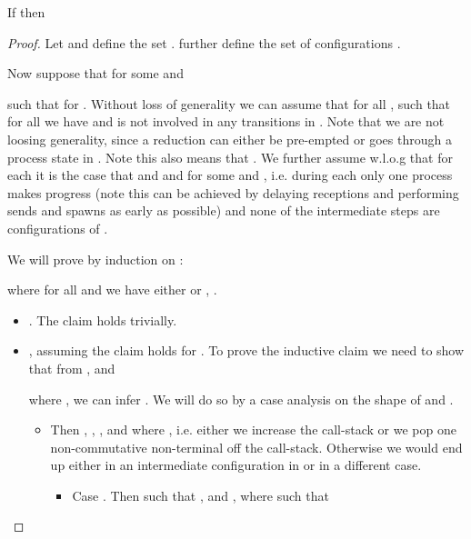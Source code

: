\begin{proposition}\label{apx:prop:conc_reduction_simulation}
If 
then 
\end{proposition}
\begin{proof}
Let  and define the set
.
further define the set of configurations
.

Now suppose that for some  and 
 
such that  for . Without loss of generality we can assume that for all ,  such that for all 
 we have  and 
 is not involved in any transitions in 
. 
Note that we are not loosing generality, since a reduction 
 can either be pre-empted or goes through a process state in . 
Note this also means that . We further assume w.l.o.g that for each  it is the case that 
 and  
and  
for some  and ,
i.e. during each  only one process makes progress (note this can be achieved by delaying receptions and performing sends and spawns as early as possible) and none of the intermediate steps are configurations of .

We will prove by induction on : 

where for all  and  we have either  or , .
\begin{itemize}
	\item . \newline
	The claim holds trivially.
	\item , assuming the claim holds for . \newline
	To prove the inductive claim we need to show that from
	, 
	and
	
	where ,
	we can infer .
	We will do so by a case analysis on the shape of  and .
	\begin{itemize}
		\item  \newline
		Then , , , 
		 and  where , i.e. either we increase the call-stack or we pop one non-commutative non-terminal off the call-stack. Otherwise we would end up either in an intermediate configuration in  or in a different case.
		\begin{itemize}
			\item Case .\newline
			Then  such that 
				,  and 
				, where  such that 
					

\end{itemize}
\end{itemize}
\end{itemize}
\end{proof}
